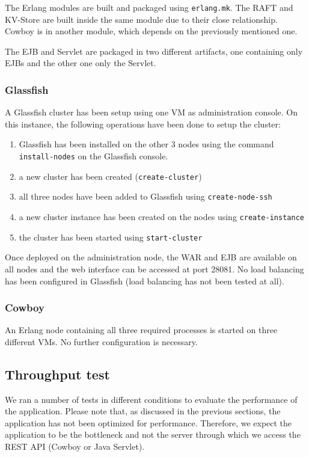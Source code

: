 \documentclass[a4paper]{article}
\begin{document}
The Erlang modules are built and packaged using \texttt{erlang.mk}. The 
RAFT and KV-Store are built inside the same module due to their close 
relationship. Cowboy is in another module, which depends on the previously
mentioned one.

The EJB and Servlet are packaged in two different artifacts, one containing 
only EJBs and the other one only the Servlet.

\subsubsection{Glassfish}
A Glassfish cluster has been setup using one VM as administration console. 
On this instance, the following operations have been done to setup the cluster:
\begin{enumerate}
    \item Glassfish has been installed on the other 3 nodes using the command
        \texttt{install-nodes} on the Glassfish console.
    \item a new cluster has been created (\texttt{create-cluster})
    \item all three nodes have been added to Glassfish using \texttt{create-node-ssh}
    \item a new cluster instance has been created on the nodes using \texttt{create-instance}
    \item the cluster has been started using \texttt{start-cluster}
\end{enumerate}

Once deployed on the administration node, the WAR and EJB are available on 
all nodes and the web interface can be accessed at port 28081. No load balancing
has been configured in Glassfish (load balancing has not been tested at all).

\subsubsection{Cowboy}
An Erlang node containing all three required processes is started on three 
different VMs. No further configuration is necessary.

\subsection{Throughput test}

We ran a number of tests in different conditions to evaluate the performance 
of the application. Please note that, as discussed in the previous sections,
the application has not been optimized for performance. Therefore, we 
expect the application to be the bottleneck and not the server through which 
we access the REST API (Cowboy or Java Servlet).
\end{document}
